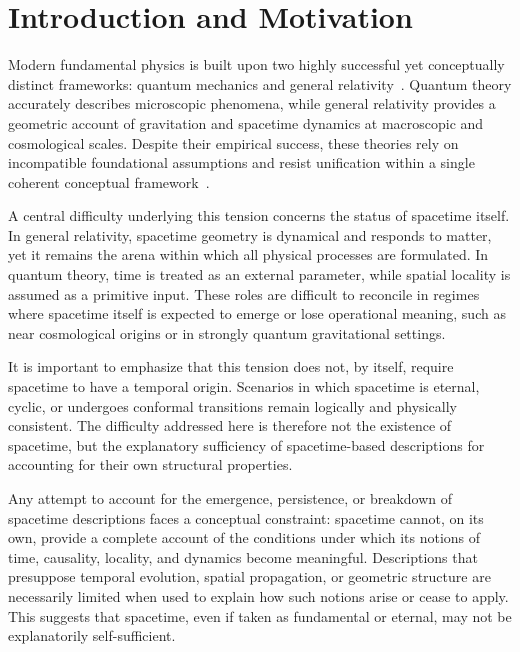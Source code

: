\clearpage

\section{Introduction and Motivation}
  \label{sec:introduction-and-motivation}

  Modern fundamental physics is built upon two highly successful yet conceptually
  distinct frameworks: quantum mechanics and general
  relativity~\cite{Dirac1930,Einstein1915}.
  Quantum theory accurately describes microscopic phenomena, while general
  relativity provides a geometric account of gravitation and spacetime dynamics
  at macroscopic and cosmological scales.
  Despite their empirical success, these theories rely on incompatible
  foundational assumptions and resist unification within a single coherent
  conceptual framework~\cite{MisnerThorneWheeler1973,Weinberg1972,Rovelli2004}.

  A central difficulty underlying this tension concerns the status of spacetime
  itself.
  In general relativity, spacetime geometry is dynamical and responds to matter,
  yet it remains the arena within which all physical processes are formulated.
  In quantum theory, time is treated as an external parameter, while spatial
  locality is assumed as a primitive input.
  These roles are difficult to reconcile in regimes where spacetime itself is
  expected to emerge or lose operational meaning, such as near cosmological
  origins or in strongly quantum gravitational settings.

  It is important to emphasize that this tension does not, by itself, require
  spacetime to have a temporal origin.
  Scenarios in which spacetime is eternal, cyclic, or undergoes conformal
  transitions remain logically and physically consistent.
  The difficulty addressed here is therefore not the existence of spacetime, but
  the explanatory sufficiency of spacetime-based descriptions for accounting for
  their own structural properties.

  Any attempt to account for the emergence, persistence, or breakdown of
  spacetime descriptions faces a conceptual constraint: spacetime cannot, on its
  own, provide a complete account of the conditions under which its notions of
  time, causality, locality, and dynamics become meaningful.
  Descriptions that presuppose temporal evolution, spatial propagation, or
  geometric structure are necessarily limited when used to explain how such
  notions arise or cease to apply.
  This suggests that spacetime, even if taken as fundamental or eternal, may not
  be explanatorily self-sufficient.

